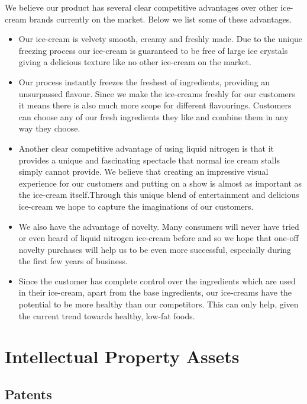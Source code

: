 \documentclass{article}
\begin{document}
We believe our product has several clear competitive advantages over
other ice-cream brands currently on the market. Below we list some of these advantages.

  \begin{itemize}
  \item Our ice-cream is velvety smooth, creamy and freshly made. Due to the unique freezing process our ice-cream is guaranteed to be free of large ice crystals giving a delicious texture like no other ice-cream on the market.

  \item Our process instantly freezes the freshest of ingredients, providing an unsurpassed flavour. Since we make the ice-creams freshly for our customers it means there is also much more scope for different flavourings. Customers can choose any of our fresh ingredients they like and combine them in any way they choose.

   \item Another clear competitive advantage of using liquid nitrogen is that it provides a unique and fascinating spectacle that normal ice cream stalls simply cannot provide. We believe that creating an impressive visual experience for our customers and putting on a show is almost as important as the ice-cream itself.Through this unique blend of entertainment and delicious ice-cream we hope to capture the imaginations of our customers.

   \item We also have the advantage of novelty. Many consumers will never have tried or even heard of liquid nitrogen ice-cream before and so we hope that one-off novelty purchases will help us to be even more successful, especially during the first few years of business.

  \item Since the customer has complete control over the ingredients which are used in their ice-cream, apart from the base ingredients, our ice-creams have the potential to be more healthy than our competitors. This can only help, given the current trend towards healthy, low-fat foods.
  \end{itemize}

\section{Intellectual Property Assets}

  \subsection{Patents}
\end{document}
